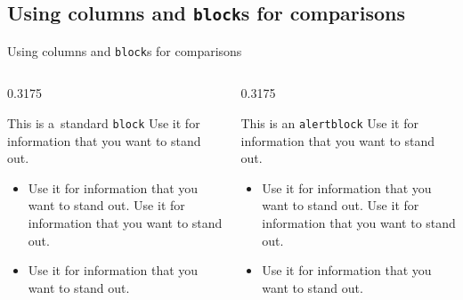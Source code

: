 \documentclass[aspectratio = 169, t, 10pt]{beamer}
\begin{document}
\subsection{Using columns and \texttt{block}s for comparisons}

\begin{frame}{Using columns and \texttt{block}s for comparisons}



\vspace{-\baselineskip}%
\begin{columns}[onlytextwidth, t]
	\begin{column}{0.3175\textwidth}
		\begin{block}{This is a~standard \texttt{block\vphantom{p}}}
			Use it for information that you want to stand out.
			\begin{itemize}
				\itemsep = 0pt
				\item Use it for information that you want to stand out. Use it for information that you want to stand out.
				\item Use it for information that you want to stand out.
			\end{itemize}
		\end{block}
	\end{column}
	\begin{column}{0.3175\textwidth}
		\begin{alertblock}{This is an \texttt{alertblock\vphantom{p}}}
			Use it for information that you want to stand out.
			\begin{itemize}
				\itemsep = 0pt
				\item Use it for information that you want to stand out. Use it for information that you want to stand out.
				\item Use it for information that you want to stand out.
			\end{itemize}

\end{alertblock}
\end{column}
\end{columns}
\end{frame}
\end{document}
